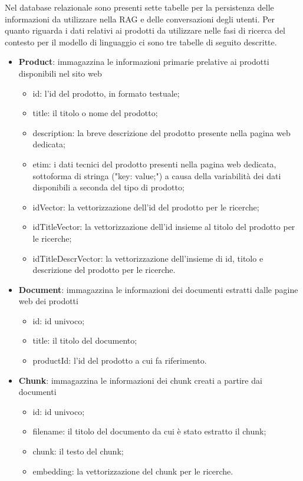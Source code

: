 Nel database relazionale sono presenti sette tabelle per la persistenza delle informazioni da utilizzare nella RAG e delle conversazioni degli utenti.
\newline
Per quanto riguarda i dati relativi ai prodotti da utilizzare nelle fasi di ricerca del contesto per il modello di linguaggio ci sono tre tabelle di seguito descritte.
\begin{itemize}
    \item \textbf{Product}: immagazzina le informazioni primarie prelative ai prodotti disponibili nel sito web
    \begin{itemize}
        \item id: l'id del prodotto, in formato testuale;
        \item title: il titolo o nome del prodotto;
        \item description: la breve descrizione del prodotto presente nella pagina web dedicata;
        \item etim: i dati tecnici del prodotto presenti nella pagina web dedicata, sottoforma di stringa ("key: value;") a causa della variabilità dei dati disponibili a seconda del tipo di prodotto;
        \item idVector: la vettorizzazione dell'id del prodotto per le ricerche;
        \item idTitleVector: la vettorizzazione dell'id insieme al titolo del prodotto per le ricerche;
        \item idTitleDescrVector: la vettorizzazione dell'insieme di id, titolo e descrizione del prodotto per le ricerche.
    \end{itemize}
    \item \textbf{Document}: immagazzina le informazioni dei documenti estratti dalle pagine web dei prodotti
     \begin{itemize}
        \item id: id univoco;
        \item title: il titolo del documento;
        \item productId: l'id del prodotto a cui fa riferimento.
    \end{itemize}
    \item \textbf{Chunk}: immagazzina le informazioni dei chunk creati a partire dai documenti
     \begin{itemize}
        \item id: id univoco;
        \item filename: il titolo del documento da cui è stato estratto il chunk;
        \item chunk: il testo del chunk;
        \item embedding: la vettorizzazione del chunk per le ricerche.
    \end{itemize} 
\end{itemize}
